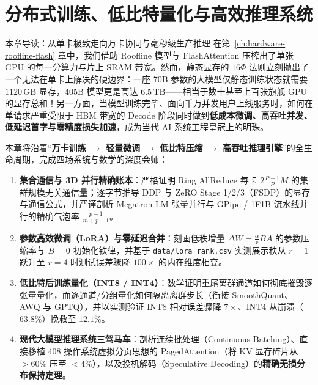 \chapter[分布式训练、LoRA、量化与高效推理]{分布式训练、低比特量化与高效推理系统}
\label{ch:dist-quant-serving}


\begin{chapIntro}{本章导读：从单卡极致走向万卡协同与毫秒级生产推理}
在第~\ref{ch:hardware-roofline-flash} 章中，我们借助 Roofline 模型与 FlashAttention 压榨出了单张 GPU 的每一分算力与片上 SRAM 带宽。然而，静态显存的 $16\Phi$ 法则立刻抛出了一个无法在单卡上解决的硬边界：一座 70B 参数的大模型仅静态训练状态就需要 $1120\,\mathrm{GB}$ 显存，405B 模型更是高达 $6.5\,\mathrm{TB}$——相当于数十甚至上百张旗舰 GPU 的显存总和！另一方面，当模型训练完毕、面向千万并发用户上线服务时，如何在单请求严重受限于 HBM 带宽的 Decode 阶段同时做到\textbf{低成本微调、高吞吐并发、低延迟首字与零精度损失加速}，成为当代 AI 系统工程皇冠上的明珠。

本章将沿着“\textbf{万卡训练 $\to$ 轻量微调 $\to$ 低比特压缩 $\to$ 高吞吐推理引擎}”的全生命周期，完成四场系统与数学的深度会师：
\begin{enumerate}
  \item \textbf{集合通信与 3D 并行精确账本}：严格证明 Ring AllReduce 每卡 $2\frac{P-1}{P}M$ 的集群规模无关通信量；逐字节推导 DDP 与 ZeRO Stage 1/2/3（FSDP）的显存与通信公式，并严谨剖析 Megatron-LM 张量并行与 GPipe / 1F1B 流水线并行的精确气泡率 $\frac{p-1}{m+p-1}$。
  \item \textbf{参数高效微调（LoRA）与零延迟合并}：刻画低秩增量 $\Delta W = \frac{\alpha}{r}BA$ 的参数压缩率与 $B=0$ 初始化铁律，并基于 \texttt{data/lora\_rank.csv} 实测展示秩从 $r=1$ 跃升至 $r=4$ 时测试误差骤降 $100\times$ 的内在维度相变。
  \item \textbf{低比特后训练量化（INT8 / INT4）}：数学证明重尾离群通道如何彻底摧毁逐张量量化，而逐通道/分组量化如何隔离离群步长（衔接 SmoothQuant、AWQ 与 GPTQ），并以实测验证 INT8 相对误差骤降 $7\times$、INT4 从崩溃（$63.8\%$）挽救至 $12.1\%$。
  \item \textbf{现代大模型推理系统三驾马车}：剖析连续批处理（Continuous Batching）、直接移植 408 操作系统虚拟分页思想的 PagedAttention（将 KV 显存碎片从 $>60\%$ 压至 $<4\%$），以及投机解码（Speculative Decoding）的\textbf{精确无损分布保持定理}。
\end{enumerate}
\end{chapIntro}

